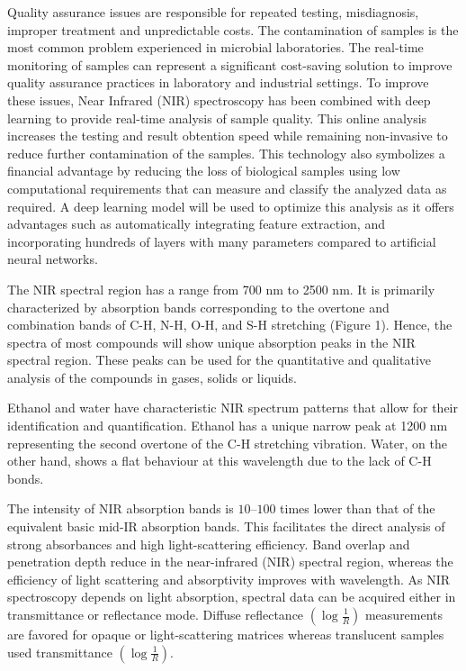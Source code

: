 \documentclass[12pt]{report}
\renewcommand{\cite}{\supercite}
\begin{document}
Quality assurance issues are responsible for repeated testing, misdiagnosis, improper treatment and unpredictable costs.\cite{CostPoorQualityrandoxlaboratories} The contamination of samples is the most common problem experienced in microbial laboratories. The real-time monitoring of samples can represent a significant cost-saving solution to improve quality assurance practices in laboratory and industrial settings.\cite{ContaminationMicrobiologicalLaboratoryendeshawabatenh2018} To improve these issues, Near Infrared (NIR) spectroscopy has been combined with deep learning to provide real-time analysis of sample quality. This online analysis increases the testing and result obtention speed while remaining non-invasive to reduce further contamination of the samples.\cite{SpeechRecognitionUsingalsobhani2021} This technology also symbolizes a financial advantage by reducing the loss of biological samples using low computational requirements that can measure and classify the analyzed data as required. A deep learning model will be used to optimize this analysis as it offers advantages such as automatically integrating feature extraction, and incorporating hundreds of layers with many parameters compared to artificial neural networks.\cite{DeepLearningNearinfraredmishra2022}

The NIR spectral region has a range from 700 nm to 2500 nm. It is primarily characterized by absorption bands corresponding to the overtone and combination bands of C-H, N-H, O-H, and S-H stretching (Figure 1). Hence, the spectra of most compounds will show unique absorption peaks in the NIR spectral region. These peaks can be used for the quantitative and qualitative analysis of the compounds in gases, solids or liquids.

Ethanol and water have characteristic NIR spectrum patterns that allow for their identification and quantification. Ethanol has a unique narrow peak at 1200 nm representing the second overtone of the C-H stretching vibration.\cite{InfraredSpectroscopyNIR} Water, on the other hand, shows a flat behaviour at this wavelength due to the lack of C-H bonds. 

The intensity of NIR absorption bands is $10 – 100$ times lower than that of the equivalent basic mid-IR absorption bands. This facilitates the direct analysis of strong absorbances and high light-scattering efficiency. Band overlap and penetration depth reduce in the near-infrared (NIR) spectral region, whereas the efficiency of light scattering and absorptivity improves with wavelength. As NIR spectroscopy depends on light absorption, spectral data can be acquired either in transmittance or reflectance mode. Diffuse reflectance $(\log \frac{1}{R} )$ measurements are favored for opaque or light-scattering matrices whereas translucent samples used transmittance $(\log \frac{1}{R})$.
\end{document}

